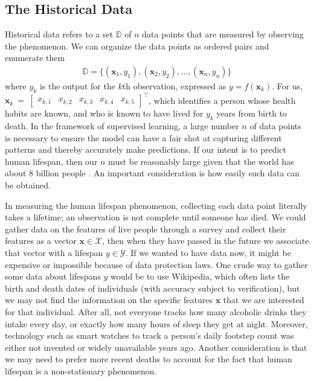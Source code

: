 \documentclass[12pt]{article}
\begin{document}
	\subsection{The Historical Data}
	Historical data refers to a set $\mathbb{D}$ of $n$ data points that are
	measured by observing the phenomenon. We can organize the data points
	as ordered pairs and enumerate them
	\begin{align*}
		\mathbb{D} = \{(\bm{x}_1,y_1), (\bm{x}_2,y_2),\ldots,(\bm{x}_n,y_n)\}
	\end{align*}
	where $y_k$ is the output for the $k$th observation, expressed as $y=f(\bm{x}_k)$.
	For us, $\bm{x}_k~=~\begin{bmatrix}
		x_{k,1} & x_{k,2} & x_{k, 3} & x_{k,4} & x_{k,5}
	\end{bmatrix}^\top$, which identifies a person whose health habits are known,
	and who is known to have lived for $y_k$ years from birth to death.
	In the framework of supervised learning, a large number $n$ of data points
	is necessary to ensure the model can have a fair shot at capturing different
	patterns and thereby accurately make predictions. If our intent is to predict
	human lifespan, then our $n$ must be reasonably large given that the world has about
	8 billion people \cite{Census-population}. An important consideration is how
	easily such data can be obtained.
	
	In measuring the human lifespan phenomenon, collecting each data point
	literally takes a lifetime; an observation is not complete until someone has
	died. We could gather data on the features of live people through a survey
	and collect their features as a vector $\bm{x}\in \mathcal{X}$, then when
	they have passed in the future we associate that vector with a lifespan
	$y\in\mathcal{Y}$. If we wanted to have data now, it might be expensive or
	impossible because of data protection laws. One crude way to gather some
	data about lifespans $y$ would be to use Wikipedia, which often lists the birth and
	death dates of individuals (with accuracy subject to verification), but
	we may not find the information on the specific features $\bm{x}$ that we
	are interested for that individual. After all, not everyone tracks how many
	alcoholic drinks they intake every day, or exactly how many hours of sleep they
	get at night. Moreover, technology such as smart watches to track a person's daily
	footstep count was either not invented or widely unavailable years ago.
	Another consideration is that we may need to prefer more recent deaths to
	account for the fact that human lifespan is a non-stationary phenomenon.
\end{document}
